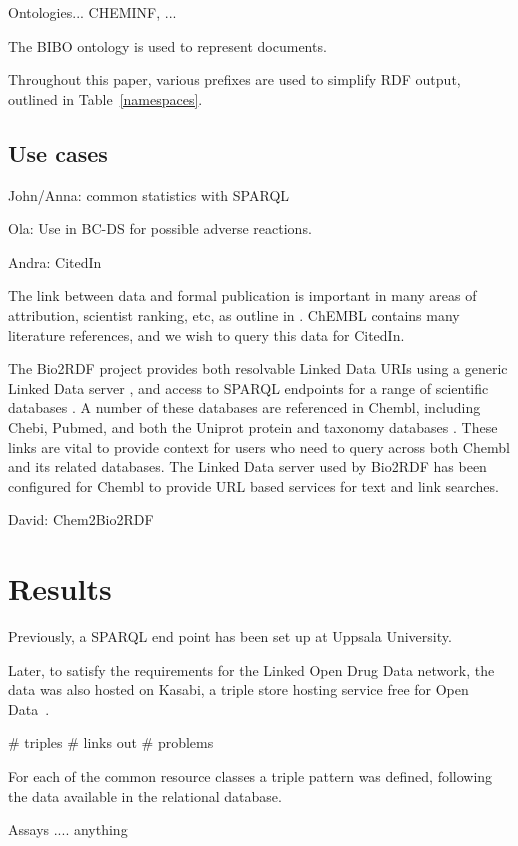 \documentclass[sw]{iosart2c}
\begin{document}
Ontologies... CHEMINF, ...

The BIBO ontology is used to represent documents.

Throughout this paper, various prefixes are used to simplify RDF output, outlined
in Table~\ref{namespaces}.

\subsection{Use cases}

John/Anna: common statistics with SPARQL

Ola: Use in BC-DS for possible adverse reactions.

Andra: CitedIn

The link between data and formal publication is important in many areas of
attribution, scientist ranking, etc, as outline in \cite{Waagmeester2012}.
ChEMBL contains many literature references, and we wish to query this data
for CitedIn.

The Bio2RDF project provides both resolvable Linked Data URIs using a generic Linked Data server \cite{Ansell2011}, and access to SPARQL endpoints for a range of scientific databases \cite{Belleau2008}. A number of these databases are referenced in Chembl, including Chebi, Pubmed, and both the Uniprot protein and taxonomy databases \cite{TheUniProtConsortium2010}. These links are vital to provide context for users who need to query across both Chembl and its related databases. The Linked Data server used by Bio2RDF has been configured for Chembl to provide URL based services for text and link searches.

David: Chem2Bio2RDF

\section{Results}\label{s3}

Previously, a SPARQL end point has been set up at Uppsala University.

Later, to satisfy the requirements for the Linked Open Drug Data \cite{Samwald2011}
network, the data was also hosted on Kasabi, a triple store hosting service
free for Open Data~\cite{}.

\# triples
\# links out
\# problems

For each of the common resource classes a triple pattern was defined, following the
data available in the relational database.

Assays .... anything
\end{document}
